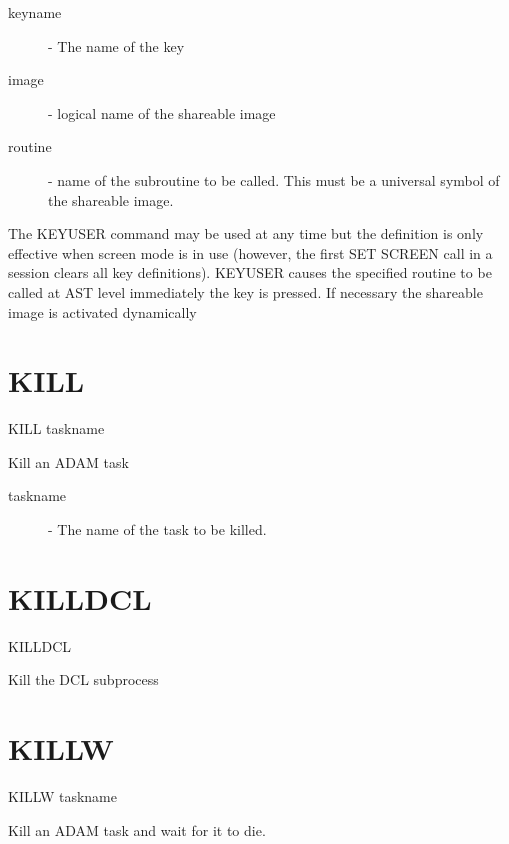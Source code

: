 \documentclass[twoside,11pt]{report}
\newcommand{\xlabel}[1]{}
\begin{document}
\begin{description}

\item[keyname] -  The name of the key

\item[image] - logical name of the shareable image 
                                     
\item[routine] - name of the subroutine to be called. This must be a universal
symbol of the shareable image.

\end{description}
                                     
The KEYUSER command may be used at any time but the definition is only
effective when screen mode is in use (however, the first SET SCREEN call
in a session clears all key definitions). KEYUSER causes the specified routine
to be called at AST level immediately the key is pressed. If necessary the
shareable image is activated dynamically

\section{\xlabel{KILL}KILL\label{KILL}}

    KILL \hspace{.5cm} taskname

 Kill an ADAM task

\begin{description}

\item[taskname] -  The name of the task to be killed.

\end{description}

\section{\xlabel{KILLDCL}KILLDCL\label{KILLDCL}}

    KILLDCL

 Kill the DCL subprocess

\section{\xlabel{KILLW}KILLW\label{KILLW}}

    KILLW \hspace{.5cm} taskname

 Kill an ADAM task and wait for it to die.
\end{document}
